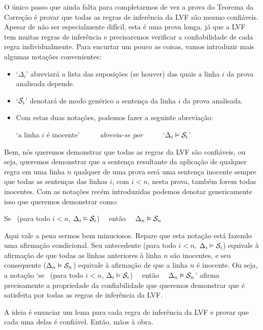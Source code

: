 O único passo que ainda falta para completarmos de vez a prova do Teorema da Correção é provar que todas as regras de inferência da LVF são mesmo confiáveis.
Apesar de não ser especialmente difícil, esta é uma prova longa, já que a LVF tem muitas regras de inferência e precisaremos verificar a confiabilidade de cada regra individualmente.
Para encurtar um pouco as coisas, vamos introduzir mais algumas notações convenientes:
\begin{itemize}
	\item `$\Delta_i$' abreviará a lista das suposições (se houver) das quais a linha $i$ da prova analisada depende.
	\item `$\mathcal{S}_i$' denotará de modo genérico a sentença da linha $i$ da prova analisada.
	\item Com estas duas notações, podemos fazer a seguinte abreviação:
		\begin{center}
			`a linha $i$ é inocente' \ \ \ \ \ \textit{abrevia-se por} \ \ \ \ \ `$\Delta_i \vDash \mathcal{S}_i$'
		\end{center}
\end{itemize}

Bem, nós queremos demonstrar que todas as regras da LVF são confiáveis, ou seja, queremos demonstrar que a sentença resultante da aplicação de qualquer regra em uma linha $n$ qualquer de uma prova será uma sentença inocente sempre que todas as sentenças das linhas $i$, com $i<n$, nesta prova, também forem todas inocentes.
Com as notações recém introduzidas podemos denotar genericamente isso que queremos demonstrar como:
\begin{center}
	Se  \ ({para todo}  $i<n$, $\Delta_i \vDash \mathcal{S}_i$) \ \ então \ \ $\Delta_n \vDash \mathcal{S}_n$
\end{center}

Aqui vale a pena sermos bem minuciosos.
Repare que esta notação está fazendo uma afirmação condicional.
Seu antecedente (para todo  $i<n$, $\Delta_i \vDash \mathcal{S}_i$) equivale à afirmação de que todas as linhas anteriores à linha $n$ são inocentes, e seu consequente ($\Delta_n \vDash \mathcal{S}_n$) equivale à afirmação de que a linha $n$ é inocente.
Ou seja, a notação  `se  \ ({para todo}  $i<n$, $\Delta_i \vDash \mathcal{S}_i$) \ \ então \ \ $\Delta_n \vDash \mathcal{S}_n$' afirma precisamente a propriedade da confiabilidade que queremos demonstrar que é satisfeita por todas as regras de inferência da LVF.

A ideia é enunciar um lema para cada regra de inferência da LVF e provar que cada uma delas é confiável.
Então, mãos à obra.

